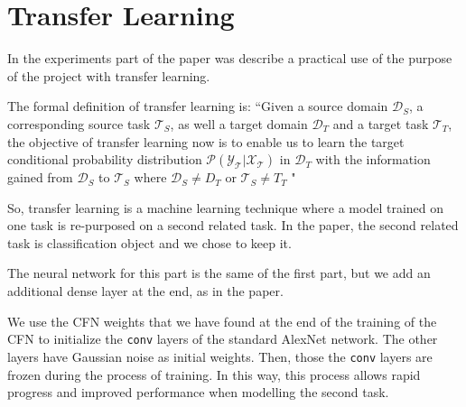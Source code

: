 \section{Transfer Learning}

In the experiments part of the paper was describe a practical use of the purpose of the project with transfer learning. 

The formal definition of transfer learning is: \textquotedblleft Given a source domain $\mathcal{D}_{S}$, a corresponding source task $\mathcal{T}_{S}$, as well a target domain $\mathcal{D}_{T}$ and a target task $\mathcal{T}_{T}$, the objective of transfer learning now is to enable us to learn the target conditional probability distribution $\mathcal{P(Y_{T}|X_{T})}$ in $\mathcal{D}_{T}$ with the information gained from $\mathcal{D}_{S}$ to $\mathcal{T}_{S}$ where $\mathcal{D}_{S} \neq {D}_{T}$ or $\mathcal{T}_{S} \neq {T}_{T}$ "

So, transfer learning is a machine learning technique where a model trained on one task is re-purposed on a second related task. In the paper, the second related task is classification object and we chose to keep it.

The neural network for this part is the same of the first part, but we add an additional dense layer at the end, as in the paper.

We use the CFN weights that we have found at the end of the training of the CFN to initialize the \texttt{conv} layers of the standard AlexNet network. The other layers have Gaussian noise as initial weights. Then, those the \texttt{conv} layers are frozen during the process of training. In this way, this process allows rapid progress and improved performance when modelling the second task. 

